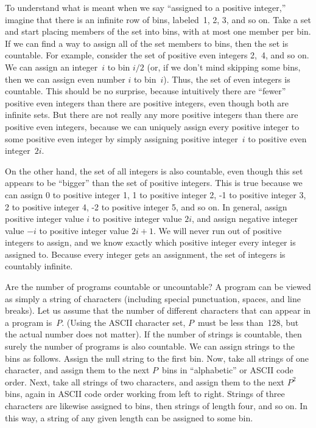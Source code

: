 To understand what is meant when we say ``assigned to a positive
integer,'' imagine that there is an infinite row of bins, labeled~1,
2, 3, and so on.
Take a set and start placing members of the set into bins, with at
most one member per bin.
If we can find a way to assign all of the set members to bins, then the
set is countable.
For example, consider the set of positive even integers 2,~4, and so
on.
We can assign an integer~\(i\) to bin \(i/2\) (or, if we don't mind
skipping some bins, then we can assign even number \(i\) to bin~\(i\)).
Thus, the set of even integers is countable.
This should be no surprise, because intuitively there are ``fewer''
positive even integers than there are positive integers,
even though both are infinite sets.
But there are not really any more positive integers than
there are positive even integers, because we can uniquely assign every
positive integer to some positive even integer by simply assigning
positive integer~\(i\) to positive even integer~\(2i\).

On the other hand, the set of all integers is also countable, even
though this set appears to be ``bigger'' than the set of positive
integers.
This is true because we can assign 0 to positive integer 1, 1 to
positive integer 2, -1 to positive integer 3, 2 to positive integer 4,
-2 to positive integer 5, and so on.
In general, assign positive integer value \(i\) to positive integer
value \(2i\), and assign negative integer value \(-i\) to positive
integer value \(2i+1\).
We will never run out of positive integers to assign, and we know
exactly which positive integer every integer is assigned to.
Because every integer gets an assignment, the set of integers is
countably infinite.

Are the number of programs countable or uncountable?
A program can be viewed as simply a string of characters (including
special punctuation, spaces, and line breaks).
Let us assume that the number of different characters that can appear
in a program is~\(P\).
(Using the ASCII character set, \(P\)~must be less than~128, but the
actual number does not matter).
If the number of strings is countable, then surely the number of
programs is also countable.
We can assign strings to the bins as follows.
Assign the null string to the first bin.
Now, take all strings of one character, and assign them to the next
\(P\)~bins in ``alphabetic'' or ASCII code order.
Next, take all strings of two characters, and assign them to the next
\(P^2\) bins, again in ASCII code order working from left to right.
Strings of three characters are likewise assigned to bins, then
strings of length four, and so on.
In this way, a string of any given length can be assigned
to some bin.

